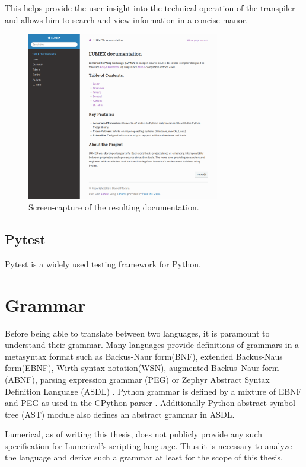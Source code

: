 This helps provide the user insight into the technical operation of the transpiler and allows him to search and view information in a concise manor.

\begin{figure}[h]

  \label{fig:compiler-stages}
  \centering
  \includegraphics[width=0.75\textwidth]{obrazky-figures/sphinx-lumex.png}
  \caption{Screen-capture of the resulting documentation.}
\end{figure}

\subsection{Pytest}
Pytest is a widely used testing framework for Python. 


\section{Grammar}
Before being able to translate between two languages, it is paramount to understand their grammar. Many languages provide definitions of grammars in a metasyntax format such as Backus-Naur form(BNF), extended Backus-Naus form(EBNF), Wirth syntax notation(WSN), augmented Backus–Naur form (ABNF), parsing expression grammar (PEG) or Zephyr Abstract Syntax Definition Language (ASDL) \cite{asdl}. Python grammar is defined by a mixture of EBNF and PEG as used in the CPython parser \cite{python3grammar}. Additionally Python abstract symbol tree (AST) module also defines an abstract grammar in ASDL\cite{python_ast}.

Lumerical, as of writing this thesis, does not publicly provide any such specification for Lumerical's scripting language. Thus it is necessary to analyze the language and derive such a grammar at least for the scope of this thesis.

